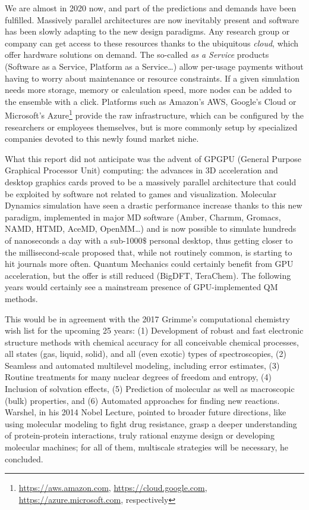 We are almost in 2020 now, and part of the predictions and demands have been fulfilled. Massively parallel architectures are now inevitably present and software has been slowly adapting to the new design paradigms. Any research group or company can get access to these resources thanks to the ubiquitous \textit{cloud}, which offer hardware solutions on demand. The so-called \textit{as a Service}  products (Software as a Service, Platform as a Service\ldots ) allow per-usage payments without having to worry about maintenance or resource constraints. If a given simulation needs more storage, memory or calculation speed, more nodes can be added to the ensemble with a click. Platforms such as Amazon's AWS, Google's Cloud or Microsoft's Azure\footnote{\url{https://aws.amazon.com}, \url{https://cloud.google.com}, \url{https://azure.microsoft.com}, respectively} provide the raw infrastructure, which can be configured by the researchers or employees themselves, but is more commonly setup by specialized companies devoted to this newly found market niche.

What this report did not anticipate was the advent of GPGPU (General Purpose Graphical Processor Unit) computing: the advances in 3D acceleration and desktop graphics cards proved to be a massively parallel architecture that could be exploited by software not related to games and visualization. Molecular Dynamics simulation have seen a drastic performance increase thanks to this new paradigm, implemented in major MD software (Amber, Charmm, Gromacs, NAMD, HTMD, AceMD, OpenMM\ldots ) and is now possible to simulate hundreds of nanoseconds a day with a sub-1000$\$$  personal desktop, thus getting closer to the millisecond-scale proposed that, while not routinely common, is starting to hit journals more often.\cite{shaw2008anton,lane2013} Quantum Mechanics could certainly benefit from GPU acceleration, but the offer is still reduced (BigDFT,\cite{genovese2011daubechies} TeraChem\cite{luehr2011dynamic}). The following years would certainly see a mainstream presence of GPU-implemented QM methods.

This would be in agreement with the 2017 Grimme's computational chemistry wish list for the upcoming 25 years: (1) Development of robust and fast electronic structure methods with chemical accuracy for all conceivable chemical processes, all states (gas, liquid, solid), and all (even exotic) types of spectroscopies, (2) Seamless and automated multilevel modeling, including error estimates, (3) Routine treatments for many nuclear degrees of freedom and entropy, (4) Inclusion of solvation effects, (5) Prediction of molecular as well as macroscopic (bulk) properties, and (6) Automated approaches for finding new reactions. Warshel, in his 2014 Nobel Lecture, pointed to broader future directions, like using molecular modeling to fight drug resistance, grasp a deeper understanding of protein-protein interactions, truly rational enzyme design or developing molecular machines; for all of them, multiscale strategies will be necessary, he concluded.\cite{Warshel2014}

